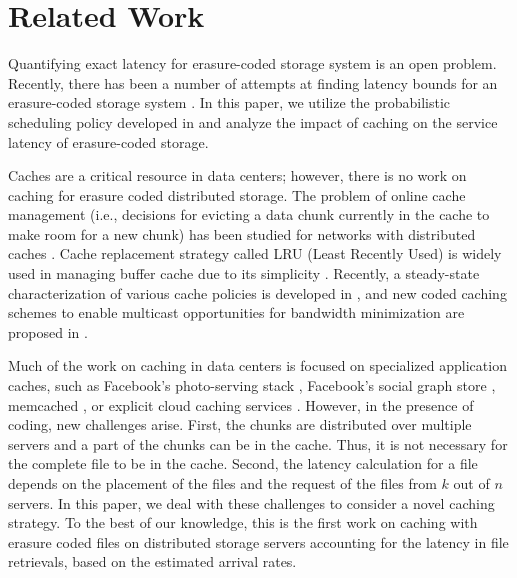 \section{Related Work}

Quantifying exact latency for erasure-coded storage system is an open problem. Recently, there has been a number of attempts at finding latency bounds for an erasure-coded storage system \cite{MG1:12,Joshi:13,MDS-Queue,CS14,Xiang:2014:Sigmetrics:2014,Yu_TON,Yu-ICDCS,Yu-CCGRID}. In this paper, we utilize the probabilistic scheduling policy developed in \cite{Xiang:2014:Sigmetrics:2014,Yu_TON} and analyze the impact of caching on the service latency of erasure-coded storage.

Caches are a critical resource in data centers; however, there is no work on caching for erasure coded distributed storage. The problem of online cache management (i.e., decisions for evicting a data chunk currently in the cache to make room for a new chunk) has been studied for networks with distributed caches \cite{td_caches_1,td_caches_2}.  Cache replacement strategy called LRU (Least Recently Used) is widely used
in managing buffer cache  due to its simplicity \cite{1453496,Megiddo:2003:ASL:1090694.1090708,Zhou:2001:MRA:647055.715773,Pelc07,td_lru}. Recently, a steady-state characterization of various cache policies is developed in \cite{td_steady}, and new coded caching schemes to enable multicast opportunities for bandwidth minimization are proposed in \cite{td_cache,td_coded}. 

Much of the work on caching in data centers is focused on specialized application caches, such as Facebook's photo-serving
stack \cite{Huang:2013:AFP:2517349.2522722}, Facebook's social graph store \cite{180185}, memcached
\cite{Fitzpatrick:2004:DCM:1012889.1012894}, or explicit cloud caching services \cite{Chockler:2010:DCC:1859184.1859190,6097162}. However, in the presence of coding, new challenges arise. First, the chunks are distributed over multiple servers and a part of the chunks can be in the cache. Thus, it is not necessary for the complete file to be in the cache. Second, the latency calculation for a file depends on the placement of the files and the request of the files from $k$ out of $n$ servers. In this paper, we deal with these challenges to consider a novel caching strategy. To the best of our knowledge, this is the first work on caching with erasure coded files on distributed storage servers accounting for the latency in file retrievals, based on the estimated arrival rates.

